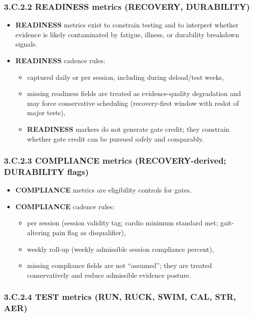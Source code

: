 \documentclass[10pt]{article}
\begin{document}
\subsubsection*{3.C.2.2 \textbf{READINESS} metrics (\textbf{RECOVERY}, \textbf{DURABILITY})}

\begin{itemize}
\item \textbf{READINESS} metrics exist to constrain testing and to interpret whether evidence is likely contaminated by fatigue, illness, or durability breakdown signals.
\item \textbf{READINESS} cadence rules:
  \begin{itemize}
  \item captured daily or per session, including during deload/test weeks,
  \item missing readiness fields are treated as evidence-quality degradation and may force conservative scheduling (recovery-first window with reslot of major tests),
  \item \textbf{READINESS} markers do not generate gate credit; they constrain whether gate credit can be pursued safely and comparably.
  \end{itemize}
\end{itemize}

\subsubsection*{3.C.2.3 \textbf{COMPLIANCE} metrics (\textbf{RECOVERY}-derived; \textbf{DURABILITY} flags)}

\begin{itemize}
\item \textbf{COMPLIANCE} metrics are eligibility controls for gates.
\item \textbf{COMPLIANCE} cadence rules:
  \begin{itemize}
  \item per session (session validity tag; cardio minimum standard met; gait-altering pain flag as disqualifier),
  \item weekly roll-up (weekly admissible session compliance percent),
  \item missing compliance fields are not “assumed”; they are treated conservatively and reduce admissible evidence posture.
  \end{itemize}
\end{itemize}

\subsubsection*{3.C.2.4 \textbf{TEST} metrics (\textbf{RUN}, \textbf{RUCK}, \textbf{SWIM}, \textbf{CAL}, \textbf{STR}, \textbf{AER})}
\end{document}
